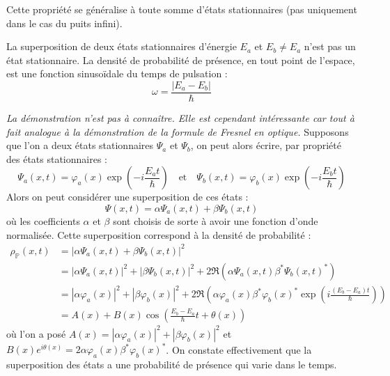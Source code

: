 \documentclass[11pt,fleqn]{book} %
\begin{document}
Cette propriété se généralise à toute somme d'états stationnaires (pas uniquement dans le cas du puits infini).
\begin{proposition}
	La superposition de deux états stationnaires d'énergie $E_a$ et $E_b \neq E_a$ n'est pas un état stationnaire. La densité de probabilité de présence, en tout point de l'espace, est une fonction sinusoïdale du temps de pulsation :
	\begin{equation}
		\omega = \frac{|E_a - E_b|}{\hbar}
	\end{equation}
\end{proposition}
\begin{demonstration}
	\textit{La démonstration n'est pas à connaître. Elle est cependant intéressante car tout à fait analogue à la démonstration de la formule de Fresnel en optique.} Supposons que l'on a deux états stationnaires $\Psi_a$ et $\Psi_b$, on peut alors écrire, par propriété des états stationnaires :
	\begin{equation}
		\Psi_a(x,t) = \varphi_a(x) \exp\left(-i\frac{E_a t}{\hbar}\right) \quad \mathrm{et} \quad \Psi_b(x,t) = \varphi_b(x) \exp\left(-i\frac{E_b t}{\hbar}\right)
	\end{equation}
	Alors on peut considérer une superposition de ces états :
	\begin{equation}
		\Psi(x,t) = \alpha \Psi_a(x,t) + \beta \Psi_b(x,t)
	\end{equation}
	où les coefficients $\alpha$ et $\beta$ sont choisis de sorte à avoir une fonction d'onde normalisée. 
	Cette superposition correspond à la densité de probabilité :
	\begin{align}
		\rho_{\mathbb{P}}(x,t) &= | \alpha \Psi_a(x,t) + \beta \Psi_b(x,t) |^2 \\
		&= |\alpha \Psi_a(x,t)|^2 + |\beta \Psi_b(x,t)|^2 + 2 \Re \left( \alpha \Psi_a(x,t) \beta^\ast \Psi_b(x,t)^\ast \right) \\
		&= |\alpha \varphi_a(x)|^2 + |\beta \varphi_b(x)|^2 + 2 \Re \left( \alpha \varphi_a(x) \beta^\ast \varphi_b(x)^\ast \exp\left( i \frac{(E_b - E_a)t}{\hbar} \right) \right) \\
		&= A(x) + B(x) \cos \left( \frac{E_b-E_a}{\hbar} t + \theta(x) \right)
	\end{align}
	où l'on a posé $A(x) = |\alpha \varphi_a(x)|^2 + |\beta \varphi_b(x)|^2$ et $B(x) e^{i\theta(x)} = 2 \alpha \varphi_a(x) \beta^\ast \varphi_b(x)^\ast$. On constate effectivement que la superposition des états a une probabilité de présence qui varie dans le temps.
\end{demonstration}
\end{document}
